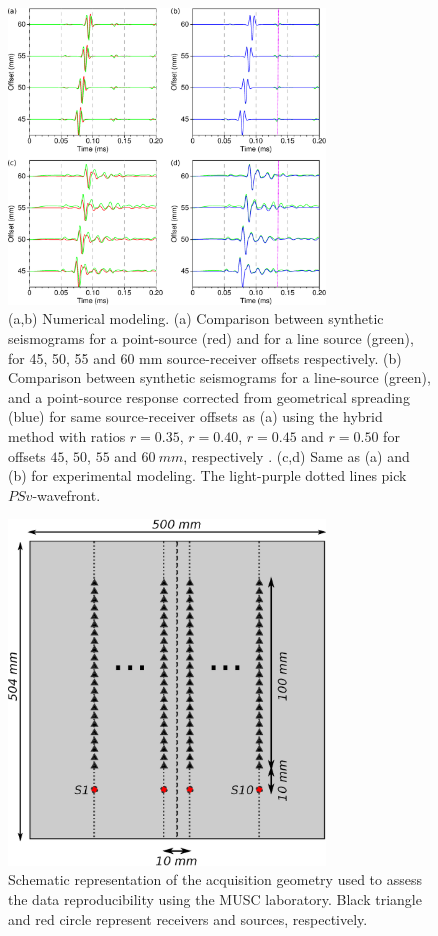 \documentclass[manuscript,revised]{geophysics}
\begin{document}
\begin{figure}[!h]
	\centering
	\includegraphics[width=0.75\textwidth]{fig/trans2d3d.eps}
	\caption{(a,b) Numerical modeling. (a) Comparison between synthetic seismograms for a point-source (red) and for a line source (green), for 45, 50, 55 and 60 mm source-receiver offsets respectively. (b) Comparison between synthetic seismograms for a line-source (green), and a point-source response corrected from geometrical spreading (blue) for same source-receiver offsets as (a) using the hybrid method with ratios $r=0.35$, $r=0.40$, $r=0.45$ and $r=0.50$ for offsets $45$, $50$, $55$ and $60\ mm$, respectively . (c,d) Same as (a) and (b) for experimental modeling. The light-purple dotted lines pick $PSv$-wavefront.}%
	\label{panel_amplitude_sem}
\end{figure}

\begin{figure}[!h]
	\centering
	\includegraphics[width=0.75\textwidth]{fig/reproducibility_acqui_principle.eps}
	\caption{Schematic representation of the acquisition geometry used to assess the data reproducibility using the MUSC laboratory. Black triangle and red circle represent receivers and sources, respectively.}
	\label{reproducibility_acqui_principle}
\end{figure}
\end{document}
